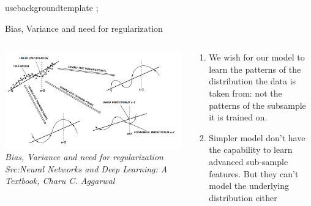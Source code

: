 usebackgroundtemplate{%
 ;
}
\begin{frame}
\end{frame}

\usebackgroundtemplate{ }

\begin{frame}{Bias, Variance and need for regularization}
	\begin{columns}[T]
        \begin{column}{0.4\textwidth}
        	\includegraphics[width=\textwidth]{images/overfit and underfit.png}
			\tiny{\textit{Bias, Variance and need for regularization\\Src:Neural Networks and Deep Learning: A Textbook, Charu C. Aggarwal  }}
        \end{column}
		\begin{column}{0.6\textwidth}
			\begin{enumerate}[$\bullet$]
				\item We wish for our model to learn the patterns of the distribution the data is taken from: not the patterns of the subsample it is trained on.\pause
				\item Simpler model don't have the capability to learn advanced sub-sample features. But they can't model the underlying distribution either 
			\end{enumerate}
		\end{column} 
    \end{columns}
\end{frame}

